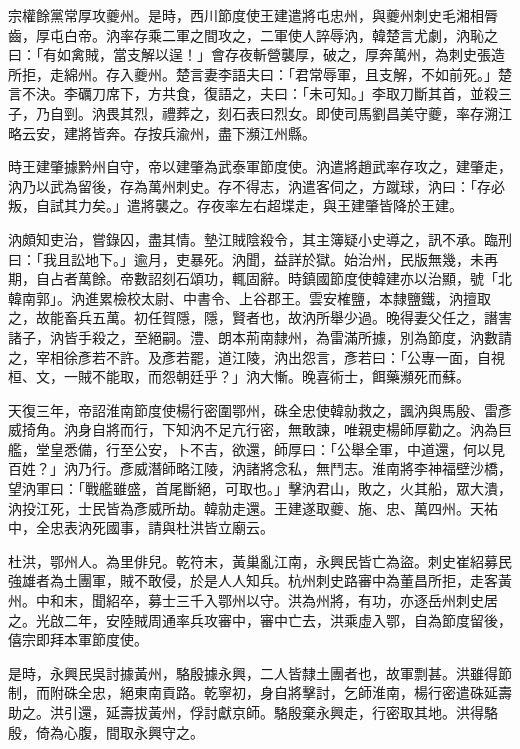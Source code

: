 \begin{pinyinscope}
 宗權餘黨常厚攻夔州。是時，西川節度使王建遣將屯忠州，與夔州刺史毛湘相脣齒，厚屯白帝。汭率存乘二軍之間攻之，二軍使人誶辱汭，韓楚言尤劇，汭恥之曰：「有如禽賊，當支解以逞！」會存夜斬營襲厚，破之，厚奔萬州，為刺史張造所拒，走綿州。存入夔州。楚言妻李語夫曰：「君常辱軍，且支解，不如前死。」楚言不決。李礪刀席下，方共食，復語之，夫曰：「未可知。」李取刀斷其首，並殺三子，乃自剄。汭畏其烈，禮葬之，刻石表曰烈女。即使司馬劉昌美守夔，率存溯江略云安，建將皆奔。存按兵渝州，盡下瀕江州縣。



 時王建肇據黔州自守，帝以建肇為武泰軍節度使。汭遣將趙武率存攻之，建肇走，汭乃以武為留後，存為萬州刺史。存不得志，汭遣客伺之，方蹴球，汭曰：「存必叛，自試其力矣。」遣將襲之。存夜率左右超堞走，與王建肇皆降於王建。



 汭頗知吏治，嘗錄囚，盡其情。墊江賊陰殺令，其主簿疑小史導之，訊不承。臨刑曰：「我且訟地下。」逾月，吏暴死。汭聞，益詳於獄。始治州，民版無幾，未再期，自占者萬餘。帝數詔刻石頌功，輒固辭。時鎮國節度使韓建亦以治顯，號「北韓南郭」。汭進累檢校太尉、中書令、上谷郡王。雲安榷鹽，本隸鹽鐵，汭擅取之，故能畜兵五萬。初任賀隱，隱，賢者也，故汭所舉少過。晚得妻父任之，譖害諸子，汭皆手殺之，至絕嗣。澧、朗本荊南隸州，為雷滿所據，別為節度，汭數請之，宰相徐彥若不許。及彥若罷，道江陵，汭出怨言，彥若曰：「公專一面，自視桓、文，一賊不能取，而怨朝廷乎？」汭大慚。晚喜術士，餌藥瀕死而蘇。



 天復三年，帝詔淮南節度使楊行密圍鄂州，硃全忠使韓勍救之，諷汭與馬殷、雷彥威掎角。汭身自將而行，下知汭不足亢行密，無敢諫，唯親吏楊師厚勸之。汭為巨艦，堂皇悉備，行至公安，卜不吉，欲還，師厚曰：「公舉全軍，中道還，何以見百姓？」汭乃行。彥威潛師略江陵，汭諸將念私，無鬥志。淮南將李神福壁沙橋，望汭軍曰：「戰艦雖盛，首尾斷絕，可取也。」擊汭君山，敗之，火其船，眾大潰，汭投江死，士民皆為彥威所劫。韓勍走還。王建遂取夔、施、忠、萬四州。天祐中，全忠表汭死國事，請與杜洪皆立廟云。



 杜洪，鄂州人。為里俳兒。乾符末，黃巢亂江南，永興民皆亡為盜。刺史崔紹募民強雄者為土團軍，賊不敢侵，於是人人知兵。杭州刺史路審中為董昌所拒，走客黃州。中和末，聞紹卒，募士三千入鄂州以守。洪為州將，有功，亦逐岳州刺史居之。光啟二年，安陸賊周通率兵攻審中，審中亡去，洪乘虛入鄂，自為節度留後，僖宗即拜本軍節度使。



 是時，永興民吳討據黃州，駱殷據永興，二人皆隸土團者也，故軍剽甚。洪雖得節制，而附硃全忠，絕東南貢路。乾寧初，身自將擊討，乞師淮南，楊行密遣硃延壽助之。洪引還，延壽拔黃州，俘討獻京師。駱殷棄永興走，行密取其地。洪得駱殷，倚為心腹，間取永興守之。




\end{pinyinscope}
